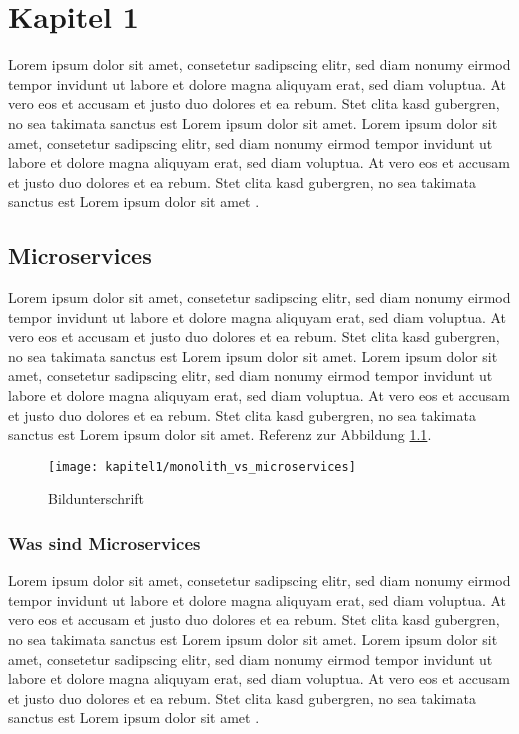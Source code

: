 \listoftodos


\chapter{Kapitel 1}
\label{chap:kapitel1}
Lorem ipsum dolor sit amet, consetetur sadipscing elitr, sed diam nonumy eirmod tempor invidunt
ut labore et dolore magna aliquyam erat, sed diam voluptua. At vero eos et accusam et justo duo
dolores et ea rebum. Stet clita kasd gubergren, no sea takimata sanctus est Lorem ipsum dolor sit
amet. Lorem ipsum dolor sit amet, consetetur sadipscing elitr, sed diam nonumy eirmod tempor
invidunt ut labore et dolore magna aliquyam erat, sed diam voluptua. At vero eos et accusam et
justo duo dolores et ea rebum. Stet clita kasd gubergren, no sea takimata sanctus est Lorem ipsum
dolor sit amet \cite{Fowler2014}.


\section{Microservices}
\label{sec:microservices}
Lorem ipsum dolor sit amet, consetetur sadipscing elitr, sed diam nonumy eirmod tempor invidunt
ut labore et dolore magna aliquyam erat, sed diam voluptua. At vero eos et accusam et justo duo
dolores et ea rebum. Stet clita kasd gubergren, no sea takimata sanctus est Lorem ipsum dolor sit
amet. Lorem ipsum dolor sit amet, consetetur sadipscing elitr, sed diam nonumy eirmod tempor
invidunt ut labore et dolore magna aliquyam erat, sed diam voluptua. At vero eos et accusam et
justo duo dolores et ea rebum. Stet clita kasd gubergren, no sea takimata sanctus est Lorem ipsum
dolor sit amet. Referenz zur Abbildung \ref{img:microprofile}.
\begin{figure}[h]
    \centering
    \texttt{[image: kapitel1/monolith\_vs\_microservices]}
    \caption[Beschreibung für Verzeichnis]{Bildunterschrift}
    \label{img:microprofile}
\end{figure}

\subsection{Was sind Microservices}
Lorem ipsum dolor sit amet, consetetur sadipscing elitr, sed diam nonumy eirmod tempor invidunt
ut labore et dolore magna aliquyam erat, sed diam voluptua. At vero eos et accusam et justo duo
dolores et ea rebum. Stet clita kasd gubergren, no sea takimata sanctus est Lorem ipsum dolor sit
amet. Lorem ipsum dolor sit amet, consetetur sadipscing elitr, sed diam nonumy eirmod tempor
invidunt ut labore et dolore magna aliquyam erat, sed diam voluptua. At vero eos et accusam et
justo duo dolores et ea rebum. Stet clita kasd gubergren, no sea takimata sanctus est Lorem ipsum
dolor sit amet \cite{Reese2009}.

